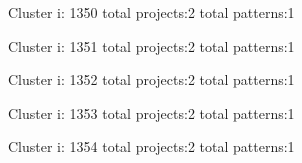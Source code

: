 Cluster i: 1350
total projects:2
total patterns:1
\begin{multicols}{1}
\end{multicols}







Cluster i: 1351
total projects:2
total patterns:1
\begin{multicols}{1}
\end{multicols}







Cluster i: 1352
total projects:2
total patterns:1
\begin{multicols}{1}
\end{multicols}







Cluster i: 1353
total projects:2
total patterns:1
\begin{multicols}{1}
\end{multicols}







Cluster i: 1354
total projects:2
total patterns:1
\begin{multicols}{1}
\end{multicols}







